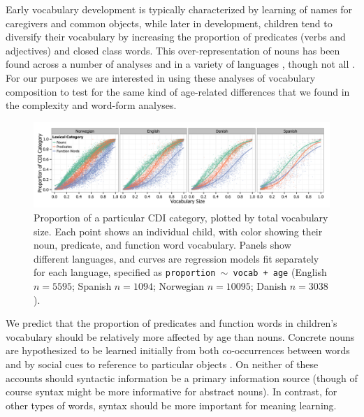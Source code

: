 \documentclass[10pt,letterpaper]{article}
\begin{document}
Early vocabulary development is typically characterized by learning of names for caregivers and common objects, while later in development, children tend to diversify their vocabulary by increasing the proportion of predicates (verbs and adjectives) and closed class words. This over-representation of nouns has been found across a number of analyses and in a variety of languages \cite{bates1994,caselli1995,bornstein2004}, though not all \cite{tardif1996,choi1995}.
For our purposes we are interested in using these analyses of vocabulary composition to test for the same kind of age-related differences that we found in the complexity and word-form analyses. 

\begin{figure}
\begin{center}
\includegraphics[width=\textwidth]{plots/composition_fit.png}
\end{center}
\caption{\label{fig:vocab_comp} Proportion of a particular CDI category, plotted by total vocabulary size. Each point shows an individual child, with color showing their noun, predicate, and function word vocabulary. Panels show different languages, and curves are regression models fit separately for each language, specified as \small{\tt{proportion $\sim$ vocab + age}} (English $n=5595$; Spanish $n=1094$; Norwegian $n=10095$; Danish $n=3038$).}
\end{figure}

We predict that the proportion of predicates and function words in children's vocabulary should be relatively more affected by age than nouns. Concrete nouns are hypothesized to be learned initially from both co-occurrences between words \cite{yu2007b} and by social cues to reference to particular objects \cite{bloom2002}. On neither of these accounts should syntactic information be a primary information source (though of course syntax might be more informative for abstract nouns). In contrast, for other types of words, syntax should be more important for meaning learning. 
\end{document}
